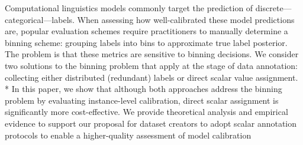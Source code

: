 Computational linguistics models commonly target the prediction of discrete—categorical—labels. When assessing how well-calibrated these model predictions are, popular evaluation schemes require practitioners to manually determine a binning scheme: grouping labels into bins to approximate true label posterior. The problem is that these metrics are sensitive to binning decisions. We consider two solutions to the binning problem that apply at the stage of data annotation: collecting either distributed (redundant) labels or direct scalar value assignment. * In this paper, we show that although both approaches address the binning problem by evaluating instance-level calibration, direct scalar assignment is significantly more cost-effective. We provide theoretical analysis and empirical evidence to support our proposal for dataset creators to adopt scalar annotation protocols to enable a higher-quality assessment of model calibration